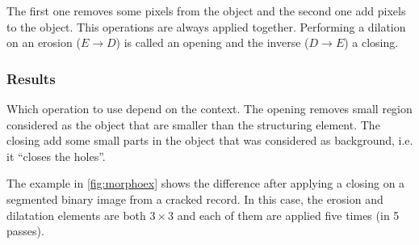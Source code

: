 The first one removes some pixels from the object and the second one add pixels to the object. This operations are always applied together. Performing a dilation on an erosion ($E \to D$) is called an opening and the inverse ($D \to E$) a closing.

\subsubsection{Results}

Which operation to use depend on the context. The opening removes small region considered as the object that are smaller than the structuring element. The closing add some small parts in the object that was considered as background, i.e. it ``closes the holes''.

The example in \autoref{fig:morphoex} shows the difference after applying a closing on a segmented binary image from a cracked record. In this case, the erosion and dilatation elements are both $3 \times 3$ and each of them are applied five times (in 5 passes).

